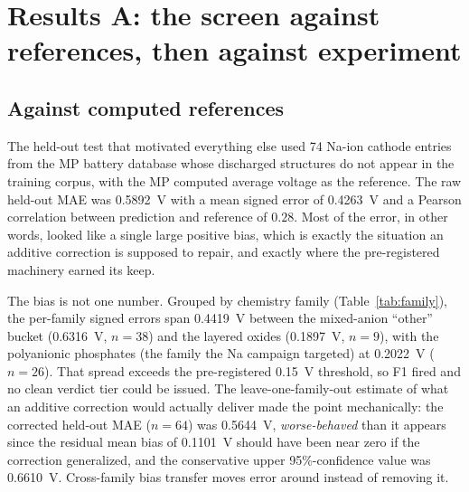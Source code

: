 \documentclass[reprint,aps,prb,amsmath,amssymb,nofootinbib,longbibliography]{revtex4-2}
\begin{document}
\section{Results A: the screen against references, then against experiment}
\label{sec:resultsA}

\subsection{Against computed references}
\label{sec:resultsA1}

The held-out test that motivated everything else used 74 Na-ion cathode
entries from the MP battery database whose discharged structures do not
appear in the training corpus, with the MP computed average voltage as the
reference. The raw held-out MAE was \SI{0.5892}{\volt} with a mean signed
error of \SI{+0.4263}{\volt} and a Pearson correlation between prediction and
reference of $0.28$. Most of the error, in other words, looked like a single
large positive bias, which is exactly the situation an additive correction
is supposed to repair, and exactly where the pre-registered machinery earned
its keep.

\begin{table}[tb]
\caption{\label{tab:family}Per-family raw bias and MAE of the active GNN
against MP computed reference voltages on the 74-compound held-out set.
The spread between family biases (families with $n\ge5$) is
\SI{0.4419}{\volt}, which fires pre-registered failure mode F1: no single
additive correction generalizes across families.}

\end{table}

The bias is not one number. Grouped by chemistry family
(Table~\ref{tab:family}), the per-family signed errors span
\SI{0.4419}{\volt} between the mixed-anion ``other'' bucket
(\SI{+0.6316}{\volt}, $n=38$) and the layered oxides (\SI{+0.1897}{\volt},
$n=9$), with the polyanionic phosphates (the family the Na campaign
targeted) at \SI{+0.2022}{\volt} ($n=26$). That spread exceeds the
pre-registered \SI{0.15}{\volt} threshold, so F1 fired and no clean verdict
tier could be issued. The leave-one-family-out estimate of what an additive
correction would actually deliver made the point mechanically: the corrected
held-out MAE ($n=64$) was \SI{0.5644}{\volt}, \emph{worse-behaved} than it
appears since the residual mean bias of \SI{+0.1101}{\volt} should have been
near zero if the correction generalized, and the conservative upper
95\%-confidence value was \SI{0.6610}{\volt}. Cross-family bias transfer
moves error around instead of removing it.
\end{document}
